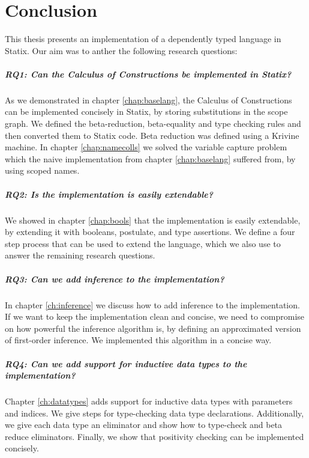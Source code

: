 \chapter{Conclusion}
\label{ch:conclusion}

This thesis presents an implementation of a dependently typed language in Statix. Our aim was to anther the following research questions:

\paragraph{RQ1: Can the Calculus of Constructions be implemented in Statix?}
As we demonstrated in chapter \ref{chap:baselang}, the Calculus of Constructions can be implemented concisely in Statix, by storing substitutions in the scope graph. We defined the beta-reduction, beta-equality and type checking rules and then converted them to Statix code. Beta reduction was defined using a Krivine machine. In chapter \ref{chap:namecolls} we solved the variable capture problem which the naive implementation from chapter \ref{chap:baselang} suffered from, by using scoped names.

\paragraph{RQ2: Is the implementation is easily extendable?}
We showed in chapter \ref{chap:bools} that the implementation is easily extendable, by extending it with booleans, postulate, and type assertions. We define a four step process that can be used to extend the language, which we also use to answer the remaining research questions.

\paragraph{RQ3: Can we add inference to the implementation?}
In chapter \ref{ch:inference} we discuss how to add inference to the implementation. If we want to keep the implementation clean and concise, we need to compromise on how powerful the inference algorithm is, by defining an approximated version of first-order inference. We implemented this algorithm in a concise way.

\paragraph{RQ4: Can we add support for inductive data types to the implementation?}
Chapter \ref{ch:datatypes} adds support for inductive data types with parameters and indices. We give steps for type-checking data type declarations. Additionally, we give each data type an eliminator and show how to type-check and beta reduce eliminators. Finally, we show that positivity checking can be implemented concisely.


